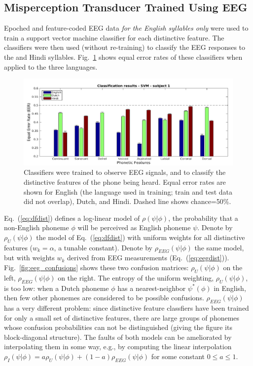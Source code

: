 \subsection{Misperception Transducer Trained Using EEG}
\label{ssec:eeg}

\newcommand{\specialcell}[2][c]{%
  \begin{tabular}[#1]{@{}c@{}}#2\end{tabular}}

Epoched and feature-coded EEG data {\em for the English syllables only}
were used to train a support vector machine classifier for each distinctive feature.
The classifiers were then used (without re-training) to classify the
EEG responses to the and Hindi syllables.
Fig.~\ref{fig:eeg_svm_eers} shows equal error rates of these
classifiers when applied to the three languages.

\begin{figure}
  \centerline{\includegraphics[width=5in]{../figs/diliberto_svmresults.png}}
  \caption{Classifiers were trained to observe EEG signals, and to
    classify the distinctive features of the phone being heard.  Equal
    error rates are shown for English (the language used in training;
    train and test data did not overlap), Dutch, and Hindi.  Dashed
    line shows chance=50\%.}
  \label{fig:eeg_svm_eers}
\end{figure}

Eq.~(\ref{eq:dfdist}) defines a log-linear model of $\rho(\psi|\phi)$,
the probability that a non-English phoneme $\phi$ will be perceived as
English phoneme $\psi$.  Denote by $\rho_U(\psi|\phi)$ the model of
Eq.~(\ref{eq:dfdist}) with uniform weights for all distinctive
features ($w_k=\alpha$, a tunable constant).  Denote by
$\rho_{EEG}(\psi|\phi)$ the same model, but with weights $w_k$ derived
from EEG measurements (Eq.~(\ref{eq:eegdist})).
Fig.~\ref{fig:eeg_confusions} shows these two confusion matrices:
$\rho_U(\psi|\phi)$ on the left, $\rho_{EEG}(\psi|\phi)$ on the
right. The entropy of the uniform weighting, $\rho_U(\psi|\phi)$, is
too low: when a Dutch phoneme $\phi$ has a nearest-neighbor
$\psi^*(\phi)$ in English, then few other phonemes are considered to
be possible confusions.  $\rho_{EEG}(\psi|\phi)$ has a very different
problem: since distinctive feature classfiers have been trained for
only a small set of distinctive features, there are large groups of
phonemes whose confusion probabilities can not be distinguished
(giving the figure its block-diagonal structure).  The faults of both
models can be ameliorated by interpolating them in some way, e.g., by
computing the linear interpolation
$\rho_I(\psi|\phi)=a\rho_U(\psi|\phi)+(1-a)\rho_{EEG}(\psi|\phi)$ for
some constant $0\le a\le 1$.

